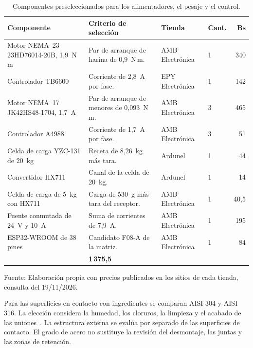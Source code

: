 \begin{table}[H]
    \centering
    \caption{Componentes preseleccionados para los alimentadores, el pesaje y el control.}
    \label{tab:seleccion_componentes}
    \footnotesize
    \renewcommand{\arraystretch}{1.15}
    \begin{tabularx}{\textwidth}{>{\raggedright\arraybackslash}p{}>{\raggedright\arraybackslash}X>{\raggedright\arraybackslash}p{}p{}r}
        \toprule
        \textbf{Componente} & \textbf{Criterio de selección} & \textbf{Tienda} & \textbf{Cant.} & \textbf{Bs} \\
        \midrule
        Motor NEMA~23 23HD76014-20B, 1,9~N\,m & Par de arranque de harina de 0,9~N\,m. & AMB Electrónica & 1 & 340 \\
        Controlador TB6600 & Corriente de 2,8~A por fase. & EPY Electrónica & 1 & 142 \\
        Motor NEMA~17 JK42HS48-1704, 1,7~A & Par de arranque de menores de 0,093~N\,m. & AMB Electrónica & 3 & 465 \\
        Controlador A4988 & Corriente de 1,7~A por fase. & AMB Electrónica & 3 & 51 \\
        Celda de carga YZC-131 de 20~kg & Receta de 8,26~kg más tara. & Ardunel & 1 & 44 \\
        Convertidor HX711 & Canal de la celda de 20~kg. & Ardunel & 1 & 14 \\
        Celda de carga de 5~kg con HX711 & Carga de 530~g más tara del receptor. & AMB Electrónica & 1 & 40,5 \\
        Fuente conmutada de 24~V y 10~A & Suma de corrientes de 7,9~A. & AMB Electrónica & 1 & 195 \\
        ESP32-WROOM de 38 pines & Candidato F08-A de la matriz. & AMB Electrónica & 1 & 84 \\
        \midrule
        \multicolumn{4}{r}{\textbf{Subtotal}} & \textbf{1\,375,5} \\
        \bottomrule
    \end{tabularx}
    \par\smallskip
    Fuente: Elaboración propia con precios publicados en los sitios de cada tienda, consulta del 19/11/2026.
\end{table}

Para las superficies en contacto con ingredientes se comparan AISI 304
y AISI 316. La elección considera la humedad, los cloruros, la limpieza
y el acabado de las uniones~\parencite{bssaFoodStainless}. La estructura
externa se evalúa por separado de las superficies de contacto. El
grado de acero no sustituye la revisión del desmontaje, las juntas y
las zonas de retención.

